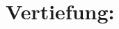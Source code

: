 

\usepackage{tikz} 
\newcommand{\floor}[1]{\left\lfloor #1\right\rfloor}
\newcommand{\ceil}[1]{\left\lceil #1 \right\rceil}


    \maketitle
    \section*{Vertiefung:}
